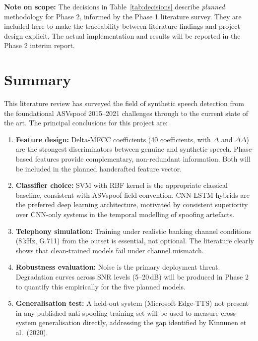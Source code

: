 \documentclass[12pt,a4paper]{article}
\begin{document}
\begin{notebox}
  \textbf{Note on scope:} The decisions in Table~\ref{tab:decisions} describe
  \emph{planned} methodology for Phase 2, informed by the Phase 1 literature survey.
  They are included here to make the traceability between literature findings and
  project design explicit. The actual implementation and results will be reported in
  the Phase 2 interim report.
\end{notebox}

\section{Summary}

This literature review has surveyed the field of synthetic speech detection from the
foundational ASVspoof 2015--2021 challenges through to the current state of the art.
The principal conclusions for this project are:

\begin{enumerate}
  \item \textbf{Feature design:} Delta-MFCC coefficients (40 coefficients, with
    $\Delta$ and $\Delta\Delta$) are the strongest discriminators between genuine and
    synthetic speech. Phase-based features provide complementary, non-redundant
    information. Both will be included in the planned handcrafted feature vector.

  \item \textbf{Classifier choice:} SVM with RBF kernel is the appropriate classical
    baseline, consistent with ASVspoof field convention. CNN-LSTM hybrids are the
    preferred deep learning architecture, motivated by consistent superiority over
    CNN-only systems in the temporal modelling of spoofing artefacts.

  \item \textbf{Telephony simulation:} Training under realistic banking channel
    conditions (8\,kHz, G.711) from the outset is essential, not optional. The
    literature clearly shows that clean-trained models fail under channel mismatch.

  \item \textbf{Robustness evaluation:} Noise is the primary deployment threat.
    Degradation curves across SNR levels (5--20\,dB) will be produced in Phase 2 to
    quantify this empirically for the five planned models.

  \item \textbf{Generalisation test:} A held-out system (Microsoft Edge-TTS) not
    present in any published anti-spoofing training set will be used to measure
    cross-system generalisation directly, addressing the gap identified by Kinnunen
    et al.\ (2020).
\end{enumerate}
\end{document}
